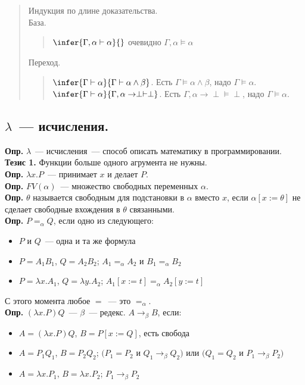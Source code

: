\documentclass{article}
\begin{document}
	\begin{quote}
		Индукция по длине доказательства. \\
		База.
		\begin{quote}
			$\infer{\Gamma, \alpha \vdash \alpha}{}$ очевидно $\Gamma, \alpha \vDash \alpha$
		\end{quote}
		Переход.
		\begin{quote}
			$\infer{\Gamma \vdash \alpha}{\Gamma \vdash \alpha \wedge \beta}$. Есть $\Gamma \vDash \alpha \wedge \beta$, надо $\Gamma \vDash \alpha$. \\
			$\infer{\Gamma \vdash \alpha}{\Gamma, \alpha \rightarrow \perp \vdash \perp}$. Есть $\Gamma, \alpha \rightarrow \perp \vDash \perp$, надо $\Gamma \vDash \alpha$.
		\end{quote}
	\end{quote}
	\subsection{$\lambda$~--- исчисления.}
	\textbf{Опр.} $\lambda$~--- исчисления~--- способ описать математику в программировании. \\
	\textbf{Тезис 1.} Функции больше одного агрумента не нужны. \\
	\textbf{Опр.} $\lambda x. P$~--- принимает $x$ и делает $P$. \\
	\textbf{Опр.} $FV(\alpha)$~--- множество свободных переменных $\alpha$. \\
	\textbf{Опр.} $\theta$ называется свободным для подстановки в $\alpha$ вместо $x$, если $\alpha [x := \theta]$ не сделает свободные вхождения в $\theta$ связанными. \\
	\textbf{Опр.} $P =_{\alpha} Q$, если одно из следующего:
	\begin{itemize}
		\item $P$ и $Q$~--- одна и та же формула
		\item $P = A_1 B_1$, $Q = A_2 B_2$; $A_1 =_{\alpha} A_2$ и $B_1 =_{\alpha} B_2$
		\item $P = \lambda x. A_1$, $Q = \lambda y. A_2$; $A_1[x := t] =_{\alpha} A_2 [y := t]$
	\end{itemize}
	С этого момента любое $=$~--- это $=_{\alpha}$. \\
	\textbf{Опр.} $(\lambda x. P)Q$~--- $\beta$~--- редекс. $A \rightarrow_{\beta} B$, если:
	\begin{itemize}
		\item $A = (\lambda x. P)Q$, $B = P[x := Q]$, есть свобода
		\item $A = P_1Q_1$, $B = P_2Q_2$; $(P_1 = P_2$ и $Q_1 \rightarrow_{\beta} Q_2)$ или $(Q_1 = Q_2$ и $P_1 \rightarrow_{\beta} P_2)$
		\item $A = \lambda x. P_1$, $B = \lambda x. P_2$; $P_1 \rightarrow_{\beta} P_2$
	\end{itemize}
\end{document}
